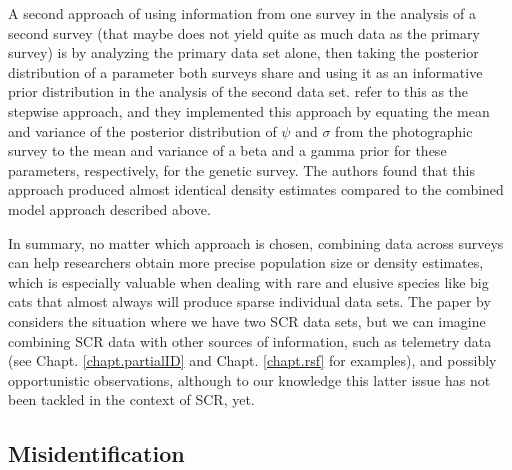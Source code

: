 A second approach of using information from one survey in the analysis
of a second survey (that maybe does not yield quite as much data as
the primary survey) is by analyzing the %
primary data set alone, then
taking the posterior distribution of a parameter both surveys share
and using it as an informative prior distribution in the analysis of
the second data set. \citet{gopalaswamy_etal:2012mee} refer to this as
the stepwise approach, and they implemented this approach by equating
the mean and variance of the posterior distribution of $\psi$ and
$\sigma$ from the photographic survey to the mean and variance of a
beta and a gamma prior for these parameters, respectively, for the
genetic survey. The authors found that this approach produced almost
identical density estimates compared to the combined model approach
described above.

In summary, no matter which approach is chosen, combining data across
surveys can help researchers %
obtain more precise population size or density estimates, which is
especially valuable when dealing with rare and elusive species like
big cats that almost always will produce sparse individual data sets.
The paper by \citet{gopalaswamy_etal:2012mee} considers the situation
where we have two SCR data sets, but we can imagine combining SCR data
with other sources of information, such as telemetry data (see
Chapt. \ref{chapt.partialID} and Chapt. \ref{chapt.rsf} for examples),
and possibly opportunistic observations, although to our knowledge
this latter issue has not been tackled in the context of SCR, yet.


\subsection{Misidentification}

